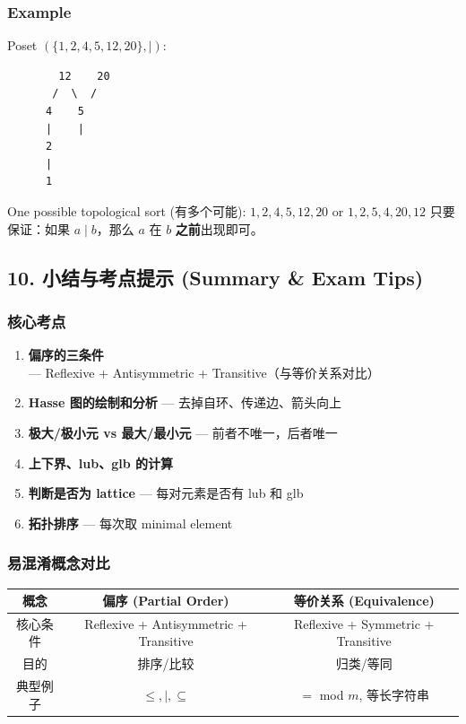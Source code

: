 \documentclass[10pt,a4paper,openany]{ctexbook}
\theoremstyle{definition}
\theoremstyle{remark}
\begin{document}
\subsubsection{Example}

Poset $(\{1,2,4,5,12,20\}, \mid)$:
{\footnotesize\begin{verbatim}
        12    20
       /  \  /
      4    5
      |    |
      2
      |
      1
\end{verbatim}}

One possible topological sort (有多个可能):
$1, 2, 4, 5, 12, 20$
or $1, 2, 5, 4, 20, 12$
只要保证：如果 $a \mid b$，那么 $a$ 在 $b$ \textbf{之前}出现即可。
\vspace{-2pt}

\subsection{10. 小结与考点提示 (Summary \& Exam Tips)}

\subsubsection{核心考点}

\begin{enumerate}
\item \textbf{偏序的三条件} — Reflexive + Antisymmetric + Transitive（与等价关系对比）
\item \textbf{Hasse 图的绘制和分析} — 去掉自环、传递边、箭头向上
\item \textbf{极大/极小元 vs 最大/最小元} — 前者不唯一，后者唯一
\item \textbf{上下界、lub、glb 的计算}
\item \textbf{判断是否为 lattice} — 每对元素是否有 lub 和 glb
\item \textbf{拓扑排序} — 每次取 minimal element

\end{enumerate}

\subsubsection{易混淆概念对比}

\begin{center}
\begin{tabular}{ccc}
\hline
概念 & 偏序 (Partial Order) & 等价关系 (Equivalence) \\ \hline
核心条件 & Reflexive + Antisymmetric + Transitive & Reflexive + Symmetric + Transitive \\
目的 & 排序/比较 & 归类/等同 \\
典型例子 & $\le, \mid, \subseteq$ & $=$ mod $m$, 等长字符串 \\
\hline
\end{tabular}

\end{center}
\end{document}
